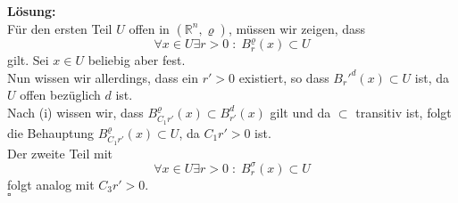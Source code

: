 \textbf{Lösung:}\\

Für den ersten Teil $U$ offen in $(\mathbb{R}^n, \varrho)$, müssen wir zeigen, dass
$$
    \forall x \in U \exists r > 0 \; : \; B_r^\varrho (x) \subset U
$$
gilt. Sei $x \in U$ beliebig aber fest.\\
Nun wissen wir allerdings, dass ein $r' > 0$ existiert, so dass $B_r'^d (x) \subset U$ ist,
da $U$ offen bezüglich $d$ ist.\\
Nach (i) wissen wir, dass $B_{C_1r'}^\varrho (x) \subset B_{r'}^d (x)$ gilt und da $\subset$ transitiv ist,
folgt die Behauptung $B_{C_1r'}^\varrho (x) \subset U$, da $C_1r' > 0$ ist.\\

Der zweite Teil mit
$$
    \forall x \in U \exists r > 0 \; : \; B_r^\sigma (x) \subset U
$$
folgt analog mit $C_3r' > 0$.\\

\mbox{}\hfill$\square$
